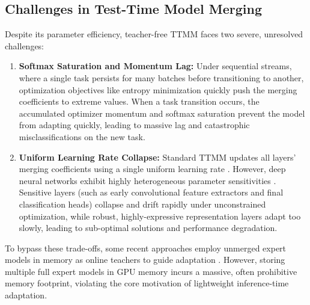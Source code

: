 \documentclass{article}
\theoremstyle{plain}
\theoremstyle{definition}
\theoremstyle{remark}
\begin{document}
\subsection{Challenges in Test-Time Model Merging}
Despite its parameter efficiency, teacher-free TTMM faces two severe, unresolved challenges:
\begin{enumerate}
  \item \textbf{Softmax Saturation and Momentum Lag:} Under sequential streams, where a single task persists for many batches before transitioning to another, optimization objectives like entropy minimization quickly push the merging coefficients to extreme values. When a task transition occurs, the accumulated optimizer momentum and softmax saturation prevent the model from adapting quickly, leading to massive lag and catastrophic misclassifications on the new task.
  \item \textbf{Uniform Learning Rate Collapse:} Standard TTMM updates all layers' merging coefficients using a single uniform learning rate \cite{yang2024adamerging}. However, deep neural networks exhibit highly heterogeneous parameter sensitivities \cite{anonymous2026lfwa}. Sensitive layers (such as early convolutional feature extractors and final classification heads) collapse and drift rapidly under unconstrained optimization, while robust, highly-expressive representation layers adapt too slowly, leading to sub-optimal solutions and performance degradation.
\end{enumerate}

To bypass these trade-offs, some recent approaches employ unmerged expert models in memory as online teachers to guide adaptation \cite{anonymous2026sata}. However, storing multiple full expert models in GPU memory incurs a massive, often prohibitive memory footprint, violating the core motivation of lightweight inference-time adaptation.
\end{document}
